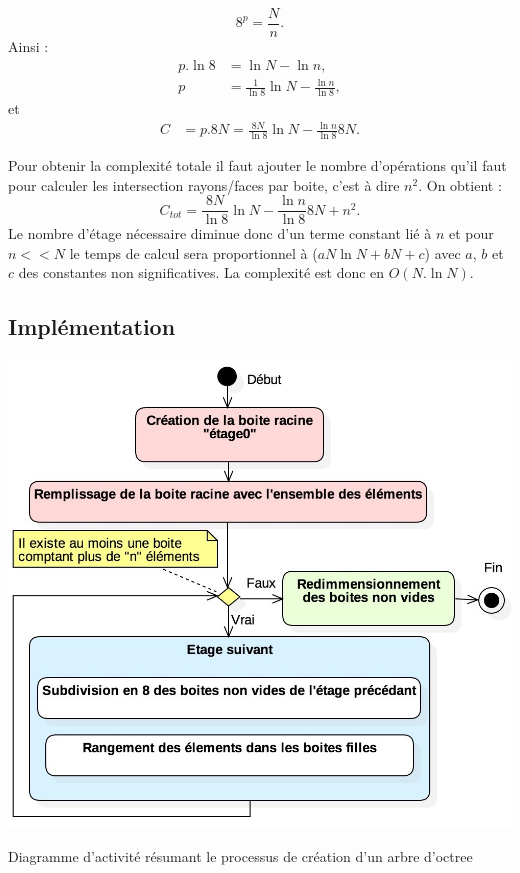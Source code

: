 \begin{equation} 
8^p = \frac{N}{n}.
\end{equation}
%
Ainsi :
\begin{align}
p.\ln{8} &= \ln{N} -  \ln{n}, \nonumber \\
p &= \frac{1}{\ln{8}}\ln{N} -  \frac{\ln{n}}{\ln{8}}, 
\end{align}
et
\begin{align}
C &=  p.8N = \frac{8N}{\ln8}\ln{N} - \frac{\ln n }{\ln8}8N.
\end{align}

Pour obtenir la complexité totale il faut ajouter le nombre d'opérations qu'il faut pour calculer les intersection rayons/faces par boite, c'est à dire $n^2$. On obtient :
\begin{equation}
C_{tot} = \frac{8N}{\ln8}\ln{N} - \frac{\ln n }{\ln8}8N + n^2.
\end{equation}
Le nombre d'étage nécessaire diminue donc d'un terme constant lié à $n$ et pour $n << N$ le temps de calcul sera proportionnel à ($aN\ln{N} + bN + c$) avec $a$, $b$ et $c$ des constantes non significatives. La complexité est donc en $O(N.\ln{N})$.



\subsection{Implémentation}


\begin{figureth}
	\includegraphics[width=0.7\linewidth]{images/DiagOctree}
	\caption{Diagramme d'activité résumant le processus de création d'un arbre d'octree}
	\label{DiagOctree}
\end{figureth}

